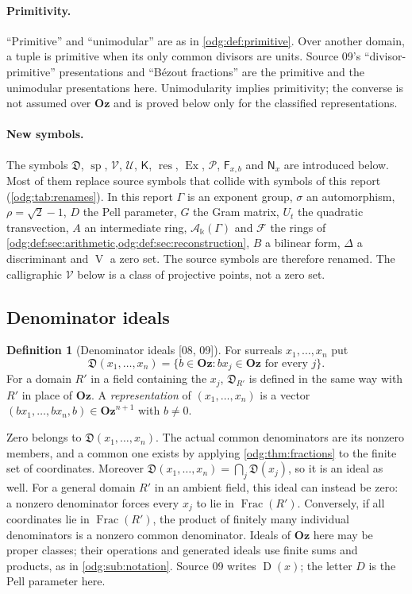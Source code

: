 \documentclass[11pt,oneside]{article}
\numberwithin{equation}{section}
\theoremstyle{definition}
\newtheorem{definition}[definition]{Definition}
\theoremstyle{remark}
\newcommand{\Oz}{\mathbf{Oz}}
\newcommand{\Frac}{\operatorname{Frac}}
\newcommand{\V}{\operatorname V}
\newcommand{\src}[1]{\textup{\textsf{\small[#1]}}}
\newcommand{\Den}{\mathfrak D}
\newcommand{\spz}{\operatorname{sp}}
\newcommand{\res}{\operatorname{res}}
\newcommand{\Ex}{\operatorname{Ex}}
\newcommand{\Vreg}{\mathcal V}
\newcommand{\Ureg}{\mathcal U}
\newcommand{\Kcong}{\mathsf K}
\newcommand{\Pmod}{\mathcal P}
\begin{document}
\paragraph{Primitivity.} ``Primitive'' and ``unimodular'' are as in
\cref{odg:def:primitive}. Over another domain, a tuple is primitive when its
only common divisors are units. Source 09's ``divisor-primitive'' presentations
and ``B\'ezout fractions'' are the primitive and the unimodular presentations
here. Unimodularity implies primitivity; the converse is not assumed over $\Oz$
and is proved below only for the classified representations.

\paragraph{New symbols.} The symbols $\Den$, $\spz$, $\Vreg$, $\Ureg$,
$\Kcong$, $\res$, $\Ex$, $\Pmod$, $\mathsf F_{x,b}$ and $\mathsf N_x$ are
introduced below. Most of them replace source symbols that collide with
symbols of this report (\cref{odg:tab:renames}). In this report $\Gamma$ is an exponent
group, $\sigma$ an automorphism, $\rho=\sqrt2-1$, $D$ the Pell parameter, $G$
the Gram matrix, $U_t$ the quadratic transvection, $A$ an intermediate ring,
$\mathcal A_\Bbbk(\Gamma)$ and $\mathcal F$ the rings of
\cref{odg:def:sec:arithmetic,odg:def:sec:reconstruction}, $B$ a bilinear form,
$\Delta$ a discriminant and $\V$ a zero set. The source symbols are therefore
renamed. The calligraphic $\Vreg$ below is a class of projective points, not a
zero set.

\subsection{Denominator ideals}\label{odg:frac:sub:ideals}

\begin{definition}[Denominator ideals \src{08, 09}]\label{odg:frac:def:den}
For surreals $x_1,\ldots,x_n$ put
\[
 \Den(x_1,\ldots,x_n)=\{b\in\Oz:bx_j\in\Oz\text{ for every }j\}.
\]
For a domain $R'$ in a field containing the $x_j$, $\Den_{R'}$ is defined in the
same way with $R'$ in place of $\Oz$. A \emph{representation} of
$(x_1,\ldots,x_n)$ is a vector $(bx_1,\ldots,bx_n,b)\in\Oz^{n+1}$ with $b\ne0$.
\end{definition}

Zero belongs to $\Den(x_1,\ldots,x_n)$. The actual common denominators are its
nonzero members, and a common one exists by applying
\cref{odg:thm:fractions} to the finite set of coordinates. Moreover
$\Den(x_1,\ldots,x_n)=\bigcap_j\Den(x_j)$, so it is an ideal as well.
For a general domain $R'$ in an ambient field, this ideal can instead be
zero: a nonzero denominator forces every $x_j$ to lie in $\Frac(R')$.
Conversely, if all coordinates lie in $\Frac(R')$, the product of finitely
many individual denominators is a nonzero common denominator.
Ideals of $\Oz$ here may be proper classes; their operations and generated
ideals use finite sums and products, as in \cref{odg:sub:notation}. Source 09 writes $\operatorname
D(x)$; the letter $D$ is the Pell parameter here.
\end{document}
